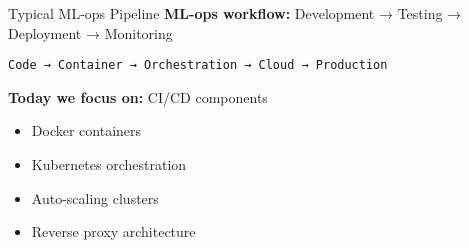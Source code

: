 \documentclass[../main.tex]{subfiles}
\begin{document}
\begin{frame}{Typical ML-ops Pipeline}
    \textbf{ML-ops workflow:} Development → Testing → Deployment → Monitoring

    \bigskip

    \begin{center}
        \texttt{Code → Container → Orchestration → Cloud → Production}
    \end{center}

    \bigskip

    \textbf{Today we focus on:} CI/CD components
    \begin{itemize}
        \item Docker containers
        \item Kubernetes orchestration
        \item Auto-scaling clusters
        \item Reverse proxy architecture
    \end{itemize}
\end{frame}
\end{document}
